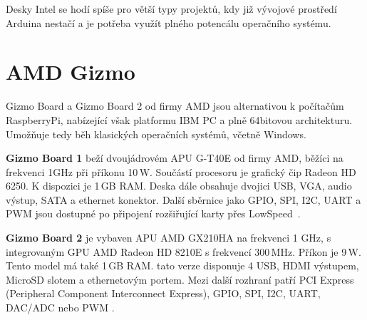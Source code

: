 Desky Intel se hodí spíše pro větší typy projektů, kdy již vývojové prostředí Arduina nestačí a je potřeba využít plného potencálu operačního systému.


 \section{AMD Gizmo}
\label{KapAMD}

	Gizmo Board a Gizmo Board 2 od firmy AMD jsou alternativou k počítačům RaspberryPi, nabízející však platformu IBM PC a plně 64bitovou architekturu. Umožňuje tedy běh klasických operačních systémů, včetně Windows.
	
		\textbf{Gizmo Board 1} beží dvoujádrovém APU G-T40E od firmy AMD, běžíci na frekvenci 1GHz při příkonu 10\,W. Součástí procesoru je grafický čip Radeon HD 6250. K dispozici je 1\,GB RAM. Deska dále obsahuje dvojici USB, VGA, audio výstup, SATA a ethernet konektor. Další sběrnice jako GPIO, SPI, I2C, UART a PWM jsou dostupné po připojení rozšiřující karty přes LowSpeed~\cite{AmdGizmo1}.
	
	\textbf{ Gizmo Board 2} je vybaven APU AMD GX210HA na frekvenci 1 GHz, s integrovaným GPU AMD Radeon HD 8210E s frekvencí 300\,MHz. Příkon je 9\,W. Tento model má také 1\,GB RAM. tato verze disponuje 4 USB, HDMI výstupem, MicroSD slotem a ethernetovým portem. Mezi další rozhraní patří PCI Express (Peripheral Component Interconnect Express), GPIO, SPI, I2C, UART, DAC/ADC nebo PWM \cite{AmdGizmo2}.


